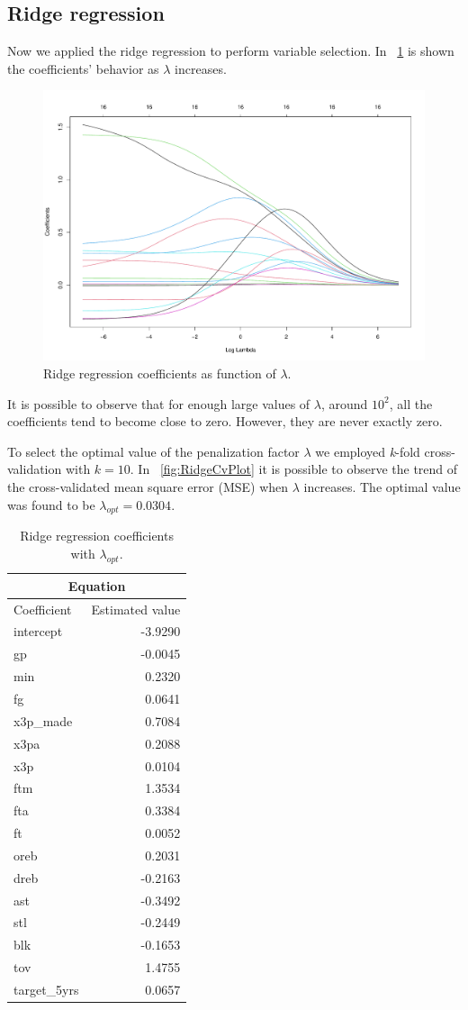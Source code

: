 \subsection{Ridge regression}

Now we applied the ridge regression to perform variable selection. In \Fig~\ref{fig:RidgeCoefVsLambda} is shown the coefficients' behavior as $\lambda$ increases. 

\begin{figure}[h]
	\centering
	\includegraphics[width=0.4\linewidth]{ImageFiles/Regression/Ridge/RidgeCoefVsLambda}
	\caption{Ridge regression coefficients as function of $\lambda$.}
	\label{fig:RidgeCoefVsLambda}
\end{figure}

It is possible to observe that for enough large values of $\lambda$, around $10^2$, all the coefficients tend to become close to zero. However, they are never exactly zero.

To select the optimal value of the penalization factor $\lambda$ we employed \textit{k}-fold cross-validation with $\textit{k}=10$. In \Fig~\ref{fig:RidgeCvPlot} it is possible to observe the trend of the cross-validated mean square error (MSE) when $\lambda$ increases. The optimal value was found to be $\lambda_{opt} = 0.0304$.

\begin{table}[H]
	\centering
	\begin{tabular}{|| l | r ||} 
		\hline
		\multicolumn{2}{|c|}{Equation} \\
		\hline
		Coefficient & Estimated value \\
		\hline
		intercept & -3.9290 \\
		gp & -0.0045 \\
		min & 0.2320 \\
		fg & 0.0641 \\
		x3p\_made & 0.7084 \\
		x3pa & 0.2088 \\
		x3p & 0.0104 \\
		ftm & 1.3534 \\
		fta & 0.3384 \\
		ft & 0.0052 \\
		oreb & 0.2031 \\
		dreb & -0.2163 \\
		ast & -0.3492 \\			
		stl & -0.2449 \\
		blk & -0.1653 \\
		tov & 1.4755 \\
		target\_5yrs & 0.0657 \\				
		\hline
	\end{tabular}
	\caption{Ridge regression coefficients with $\lambda_{opt}$.}
	\label{table:FinalRidgeCoef}
\end{table}


